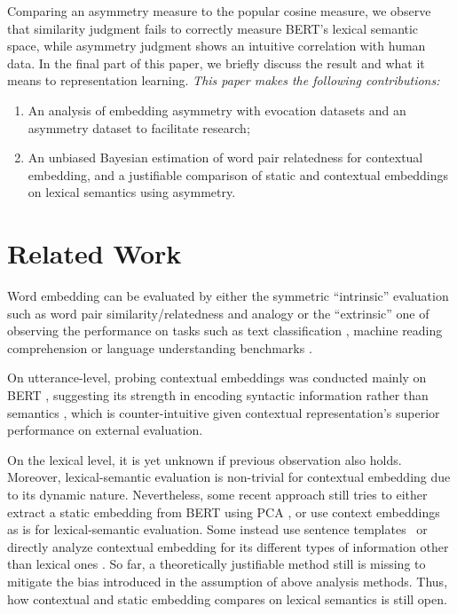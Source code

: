 \documentclass[letterpaper]{article} %
\begin{document}
Comparing an asymmetry measure to the popular cosine measure, we observe that similarity judgment fails to correctly measure BERT's lexical semantic space, while asymmetry judgment shows an intuitive correlation with human data. In the final part of this paper, we briefly discuss the result and what it means to representation learning. \textit{This paper makes the following contributions:} 
\begin{enumerate}
    \item An analysis of embedding asymmetry with evocation datasets and an asymmetry dataset to facilitate research;
    \item An unbiased Bayesian estimation of word pair relatedness for contextual embedding, and a justifiable comparison of static and contextual embeddings on lexical semantics using asymmetry.
\end{enumerate}

\section{Related Work}

Word embedding can be evaluated by either the  symmetric ``intrinsic'' evaluation such as word pair similarity/relatedness \cite{agirre-etal-2009-study,hill2015simlex} and analogy \cite{mikolov2013distributed} or the ``extrinsic'' one of observing the performance on tasks such as text classification \cite{joulin2016fasttext}, machine reading comprehension \cite{rajpurkar-etal-2016-squad} or language understanding benchmarks \cite{wang2018glue,wang2019superglue}. 

On utterance-level, probing contextual embeddings was conducted mainly on BERT \cite{devlin2018bert}, suggesting its strength in encoding syntactic information rather than semantics \cite{hewitt2019structural,reif2019visualizing,tenney2019you,tenney2019bert,mickus2019mean}, which is counter-intuitive given contextual representation's superior performance on external evaluation.  

On the lexical level, it is yet unknown if previous observation also holds. Moreover, lexical-semantic evaluation is non-trivial for contextual embedding due to its dynamic nature. Nevertheless, some recent approach still tries to either extract a static embedding from BERT using PCA \cite{Ethayarajh2019HowCA,coenen2019visualizing}, or use context embeddings as is \cite{mickus2019mean} for lexical-semantic evaluation. Some instead use sentence templates~\citep{petroni2019language,bouraoui2019inducing} or directly analyze contextual embedding for its different types of information other than lexical ones \cite{brunner2019validity,clark2019what,coenen2019visualizing,jawahar2019does}. So far, a theoretically justifiable method still is missing to mitigate the bias introduced in the assumption of above analysis methods. Thus, how contextual and static embedding compares on lexical semantics is still open. 
\end{document}
